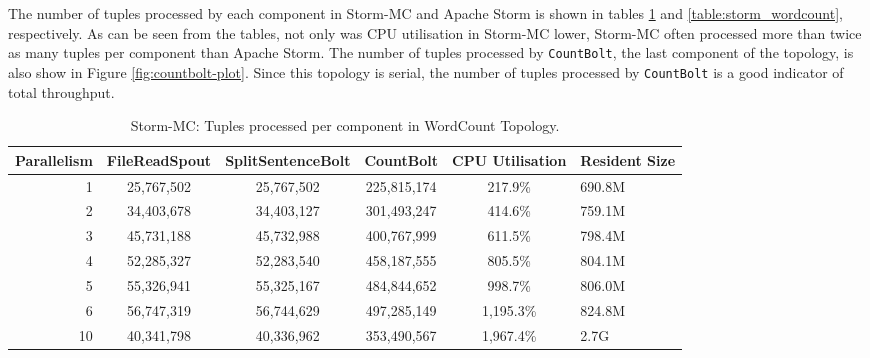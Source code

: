 The number of tuples processed by each component in Storm-MC and Apache Storm is shown in tables \ref{table:storm_mc_wordcount} and \ref{table:storm_wordcount}, respectively. As can be seen from the tables, not only was CPU utilisation in Storm-MC lower, Storm-MC often processed more than twice as many tuples per component than Apache Storm.  The number of tuples processed by \texttt{CountBolt}, the last component of the topology, is also show in Figure \ref{fig:countbolt-plot}. Since this topology is serial, the number of tuples processed by \texttt{CountBolt} is a good indicator of total throughput.

\begin{table}[!htb]
\begin{adjustwidth}{-0.5in}{-0.5in}
\centering
\small
\begin{tabular}{@{}rccccl@{}}
    \textbf{Parallelism} & \textbf{FileReadSpout} & \textbf{SplitSentenceBolt} & \textbf{CountBolt} & \textbf{CPU Utilisation} & \textbf{Resident Size} \\ \toprule
    1 & {25,767,502} & {25,767,502} & {225,815,174} & {217.9\%} & {690.8M} \\
    2 & {34,403,678} & {34,403,127} & {301,493,247} & {414.6\%} & {759.1M} \\
    3 & {45,731,188} & {45,732,988} & {400,767,999} & {611.5\%} & {798.4M} \\
    4 & {52,285,327} & {52,283,540} & {458,187,555} & {805.5\%} & {804.1M} \\
	5 & {55,326,941} & {55,325,167} & {484,844,652} & {998.7\%} & {806.0M} \\
	6 & {56,747,319} & {56,744,629} & {497,285,149} & {1,195.3\%} & {824.8M} \\
	10 & {40,341,798} & {40,336,962} & {353,490,567} & {1,967.4\%} & {2.7G} \\
\end{tabular}
\caption{Storm-MC: Tuples processed per component in WordCount Topology.}
\label{table:storm_mc_wordcount}
\end{adjustwidth}
\end{table}

